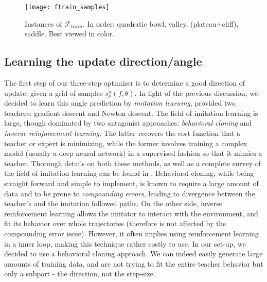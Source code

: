 			\begin{figure}[h!]
				\begin{center}
					\texttt{[image: ftrain\_samples]}
					\caption[Instances of $\mathcal{F}_{train}$]{Instances of $\mathcal{F}_{train}$. In order: quadratic bowl, valley, (plateau+cliff), saddle. Best viewed in color. }
					\label{fig::sample_from_metatrain}
				\end{center}
			\end{figure}
	
	
	\subsection{Learning the update direction/angle}
	\label{sec::angle}
	The first step of our three-step optimizer is to determine a good direction of update, given a grid of samples $s_\delta^n(f,\theta)$. In light of the previous discussion, we decided to learn this angle prediction by \emph{imitation learning}, provided two teachers: gradient descent and Newton descent. The field of imitation learning is large, though dominated by two antagonist approaches: \emph{behavioral cloning} and \emph{inverse reinforcement learning}. The latter recovers the cost function that a teacher or expert is minimizing, while the former involves training a complex model (usually a deep neural network) in a supervised fashion so that it mimics a teacher. Thorough details on both these methods, as well as a complete survey of the field of imitation learning can be found in \cite{Billard2016}. Behavioral cloning, while being straight forward and simple to implement, is known to require a large amount of data and to be prone to \emph{compounding errors}, leading to divergence between the teacher's and the imitation followed paths. 
		On the other side, inverse reinforcement learning allows the imitator to interact with the environment, and fit its behavior over whole trajectories (therefore is not affected by the compounding error issue). However, it often implies using reinforcement learning in a inner loop, making this technique rather costly to use.  In our set-up, we decided to use a behavioral cloning approach. We can indeed easily generate large amounts of training data, and are not trying to fit the entire teacher behavior but only a subpart - the direction, not the step-size.
			
